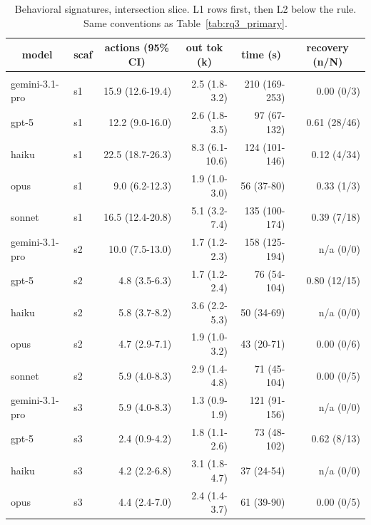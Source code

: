 \documentclass[10pt]{article} %
\begin{document}
    \begin{table}[h]
        \caption{Behavioral signatures, intersection slice. L1 rows first, then L2 below the rule. Same conventions as Table~\ref{tab:rq3_primary}.}
    \label{tab:rq3_intersection}
    \begin{center}
    \footnotesize
    \begin{tabular}{llrrrr}
        \multicolumn{1}{c}{\bf model} & \multicolumn{1}{c}{\bf scaf} & \multicolumn{1}{c}{\bf actions (95\% CI)} & \multicolumn{1}{c}{\bf out tok (k)} & \multicolumn{1}{c}{\bf time (s)} & \multicolumn{1}{c}{\bf recovery (n/N)} \\
        \hline \\
        gemini-3.1-pro & s1 & 15.9 (12.6-19.4) & 2.5 (1.8-3.2)  & 210 (169-253) & 0.00 (0/3) \\
        gpt-5          & s1 & 12.2 (9.0-16.0)  & 2.6 (1.8-3.5)  & 97 (67-132)   & 0.61 (28/46) \\
        haiku          & s1 & 22.5 (18.7-26.3) & 8.3 (6.1-10.6) & 124 (101-146) & 0.12 (4/34) \\
        opus           & s1 & 9.0 (6.2-12.3)   & 1.9 (1.0-3.0)  & 56 (37-80)    & 0.33 (1/3) \\
        sonnet         & s1 & 16.5 (12.4-20.8) & 5.1 (3.2-7.4)  & 135 (100-174) & 0.39 (7/18) \\
        gemini-3.1-pro & s2 & 10.0 (7.5-13.0)  & 1.7 (1.2-2.3)  & 158 (125-194) & n/a (0/0) \\
        gpt-5          & s2 & 4.8 (3.5-6.3)    & 1.7 (1.2-2.4)  & 76 (54-104)   & 0.80 (12/15) \\
        haiku          & s2 & 5.8 (3.7-8.2)    & 3.6 (2.2-5.3)  & 50 (34-69)    & n/a (0/0) \\
        opus           & s2 & 4.7 (2.9-7.1)    & 1.9 (1.0-3.2)  & 43 (20-71)    & 0.00 (0/6) \\
        sonnet         & s2 & 5.9 (4.0-8.3)    & 2.9 (1.4-4.8)  & 71 (45-104)   & 0.00 (0/5) \\
        gemini-3.1-pro & s3 & 5.9 (4.0-8.3)    & 1.3 (0.9-1.9)  & 121 (91-156)  & n/a (0/0) \\
        gpt-5          & s3 & 2.4 (0.9-4.2)    & 1.8 (1.1-2.6)  & 73 (48-102)   & 0.62 (8/13) \\
        haiku          & s3 & 4.2 (2.2-6.8)    & 3.1 (1.8-4.7)  & 37 (24-54)    & n/a (0/0) \\
        opus           & s3 & 4.4 (2.4-7.0)    & 2.4 (1.4-3.7)  & 61 (39-90)    & 0.00 (0/5) \\

\end{tabular}
\end{center}
\end{table}
\end{document}
